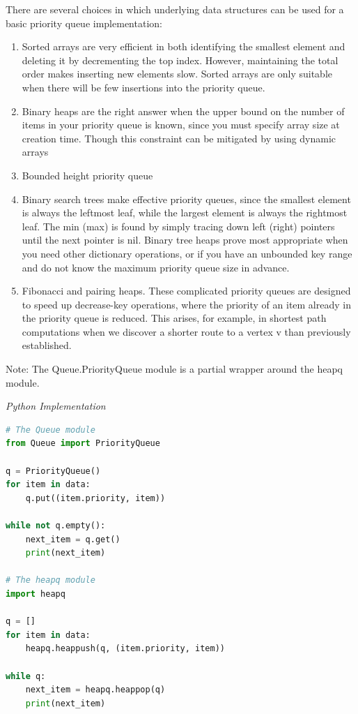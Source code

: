 \documentclass{article}
\begin{document}
    There are several choices in which underlying data structures can be used for a basic priority queue implementation:
    \begin{enumerate}
        \item Sorted arrays are very efficient in both identifying the smallest element and deleting it by decrementing the top index. However, maintaining the total order makes inserting new elements slow. Sorted arrays are only suitable when there will be few insertions into the priority queue.
        
        \item Binary heaps are the right answer when the upper bound on the number of items in your priority queue is known, since you must specify array size at creation time. Though this constraint can be mitigated by using dynamic arrays
        
        \item Bounded height priority queue
        
        \item Binary search trees make effective priority queues, since the smallest element is always the leftmost leaf, while the largest element is always the rightmost leaf. The min (max) is found by simply tracing down left (right) pointers until the next pointer is nil. Binary tree heaps prove most appropriate when you need other dictionary operations, or if you have an unbounded key range and do not know the maximum priority queue size in advance.
        
        \item Fibonacci and pairing heaps. These complicated priority queues are designed to speed up decrease-key operations, where the priority of an item already in the priority queue is reduced. This arises, for example, in shortest path computations when we discover a shorter route to a vertex v than previously established.
    \end{enumerate}
    
    Note: The Queue.PriorityQueue module is a partial wrapper around the heapq module.
    
\vspace{8pt} \emph{Python Implementation}
\begin{lstlisting}[language=Python]
# The Queue module
from Queue import PriorityQueue

q = PriorityQueue()
for item in data:
    q.put((item.priority, item))

while not q.empty():
    next_item = q.get()
    print(next_item)

# The heapq module
import heapq

q = []
for item in data:
    heapq.heappush(q, (item.priority, item))

while q:
    next_item = heapq.heappop(q)
    print(next_item)
\end{lstlisting}
\end{document}
